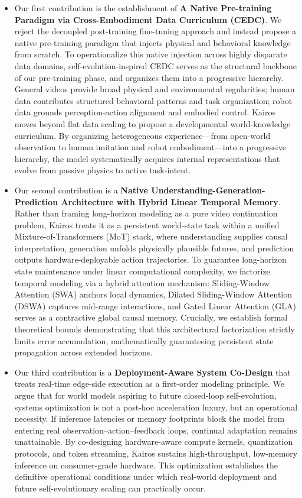 \documentclass{llmxive}
\begin{document}
\begin{itemize}
    \item 
Our first contribution is the establishment of \textbf{A Native Pre-training Paradigm via Cross-Embodiment Data Curriculum (CEDC)}. We reject the decoupled post-training fine-tuning approach and instead propose a native pre-training paradigm that injects physical and behavioral knowledge from scratch. To operationalize this native injection across highly disparate data domains, self-evolution-inspired CEDC serves as the structural backbone of our pre-training phase, and organizes them into a progressive hierarchy. General videos provide broad physical and environmental regularities; human data contributes structured behavioral patterns and task organization; robot data grounds perception-action alignment and embodied control. Kairos moves beyond flat data scaling to propose a developmental world-knowledge curriculum. By organizing heterogeneous experience—from open-world observation to human imitation and robot embodiment—into a progressive hierarchy, the model systematically acquires internal representations that evolve from passive physics to active task-intent. 


\item Our second contribution is a \textbf{Native Understanding-Generation-Prediction Architecture with Hybrid Linear Temporal Memory}. Rather than framing long-horizon modeling as a pure video continuation problem, Kairos treats it as a persistent world-state task within a unified Mixture-of-Transformers (MoT) stack, where understanding supplies causal interpretation, generation unfolds physically plausible futures, and prediction outputs hardware-deployable action trajectories. To guarantee long-horizon state maintenance under linear computational complexity, we factorize temporal modeling via a hybrid attention mechanism: Sliding-Window Attention (SWA) anchors local dynamics, Dilated Sliding-Window Attention (DSWA) captures mid-range interactions, and Gated Linear Attention (GLA) serves as a contractive global causal memory. Crucially, we establish formal theoretical bounds demonstrating that this architectural factorization strictly limits error accumulation, mathematically guaranteeing persistent state propagation across extended horizons.

\item Our third contribution is a \textbf{Deployment-Aware System Co-Design} that treats real-time edge-side execution as a first-order modeling principle. We argue that for world models aspiring to future closed-loop self-evolution, systems optimization is not a post-hoc acceleration luxury, but an operational necessity. If inference latencies or memory footprints block the model from entering real observation–action–feedback loops, continual adaptation remains unattainable. By co-designing hardware-aware compute kernels, quantization protocols, and token streaming, Kairos sustains high-throughput, low-memory inference on consumer-grade hardware. This optimization establishes the definitive operational conditions under which real-world deployment and future self-evolutionary scaling can practically occur.






\end{itemize}
\end{document}
